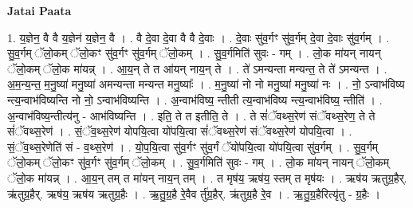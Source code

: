 \documentclass[17pt]{extarticle}
\begin{document}
\textbf{Jatai Paata} \newline

1. य॒ज्ञेन॒ वै वै य॒ज्ञेन॑ य॒ज्ञेन॒ वै । . वै दे॒वा दे॒वा वै वै दे॒वाः । . दे॒वाः सु॑व॒र्गꣳ सु॑व॒र्गम् दे॒वा दे॒वाः सु॑व॒र्गम् । . सु॒व॒र्गम् ॅलो॒कम् ॅलो॒कꣳ सु॑व॒र्गꣳ सु॑व॒र्गम् ॅलो॒कम् । . सु॒व॒र्गमिति॑ सुवः - गम् । . लो॒क मा॑यन् नायन् ॅलो॒कम् ॅलो॒क मा॑यन्न् । . आ॒य॒न् ते त आ॑यन् नाय॒न् ते । . ते॑ ऽमन्यन्ता मन्यन्त॒ ते ते॑ ऽमन्यन्त । . अ॒म॒न्य॒न्त॒ म॒नु॒ष्या॑ मनु॒ष्या॑ अमन्यन्ता मन्यन्त मनु॒ष्याः᳚ । . म॒नु॒ष्या॑ नो नो मनु॒ष्या॑ मनु॒ष्या॑ नः । . नो॒ ऽन्वाभ॑विष्य न्त्य॒न्वाभ॑विष्यन्ति नो नो॒ ऽन्वाभ॑विष्यन्ति । . अ॒न्वाभ॑विष्य॒ न्तीती त्य॒न्वाभ॑विष्य न्त्य॒न्वाभ॑विष्य॒ न्तीति॑ । . अ॒न्वाभ॑विष्य॒न्तीत्य॑नु - आभ॑विष्यन्ति । . इति॒ ते त इतीति॒ ते । . ते सं॑ॅवथ्स॒रेण॑ संॅवथ्स॒रेण॒ ते ते सं॑ॅवथ्स॒रेण॑ । . सं॒ॅव॒थ्स॒रेण॑ योपयि॒त्वा यो॑पयि॒त्वा सं॑ॅवथ्स॒रेण॑ संॅवथ्स॒रेण॑ योपयि॒त्वा । . सं॒ॅव॒थ्स॒रेणेति॑ सं - व॒थ्स॒रेण॑ । . यो॒प॒यि॒त्वा सु॑व॒र्गꣳ सु॑व॒र्गं ॅयो॑पयि॒त्वा यो॑पयि॒त्वा सु॑व॒र्गम् । . सु॒व॒र्गम् ॅलो॒कम् ॅलो॒कꣳ सु॑व॒र्गꣳ सु॑व॒र्गम् ॅलो॒कम् । . सु॒व॒र्गमिति॑ सुवः - गम् । . लो॒क मा॑यन् नायन् ॅलो॒कम् ॅलो॒क मा॑यन्न् । . आ॒य॒न् तम् त मा॑यन् नाय॒न् तम् । . त मृष॑य॒ ऋष॑य॒ स्तम् त मृष॑यः । . ऋष॑य ऋतुग्र॒हैर्. ऋ॑तुग्र॒हैर्. ऋष॑य॒ ऋष॑य ऋतुग्र॒हैः । . ऋ॒तु॒ग्र॒है रे॒वैव र्तु॑ग्र॒हैर्. ऋ॑तुग्र॒है रे॒व । . ऋ॒तु॒ग्र॒हैरित्यृ॑तु - ग्र॒हैः । \newline
\end{document}
